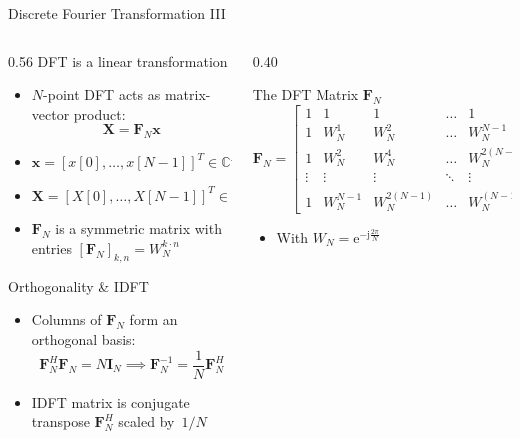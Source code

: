\begin{frame}{Discrete Fourier Transformation III}
\begin{columns}[T,onlytextwidth]
    \begin{column}{0.56\textwidth}
        DFT is a linear transformation
        \begin{itemize}
            \item $N$-point DFT acts as matrix-vector product:
                  \begin{equation*}
                      \mathbf{X} = \mathbf{F}_N \mathbf{x}
                  \end{equation*}
            \item $\mathbf{x} = [x[0], \dots, x[N-1]]^T \in \mathbb{C}^N$
            \item $\mathbf{X} = [X[0], \dots, X[N-1]]^T \in \mathbb{C}^N$
            \item $\mathbf{F}_N$ is a symmetric matrix with entries $[\mathbf{F}_N]_{k,n} = W_N^{k \cdot n}$
        \end{itemize}
        \vspace{0.4em}
        Orthogonality \& IDFT
        \begin{itemize}
            \item Columns of $\mathbf{F}_N$ form an orthogonal basis:
                  \begin{equation*}
                      \mathbf{F}_N^H \mathbf{F}_N = N \mathbf{I}_N \implies \mathbf{F}_N^{-1} = \frac{1}{N}\mathbf{F}_N^H
                  \end{equation*}
            \item IDFT matrix is conjugate transpose $\mathbf{F}_N^H$ scaled by~$1/N$
        \end{itemize}
        \vspace{0.4em}
    \end{column}

    \begin{column}{0.40\textwidth}
        \begin{block}{The DFT Matrix $\mathbf{F}_N$}
            \centering
            \footnotesize
            $\mathbf{F}_N = \begin{bmatrix}
                1 & 1 & 1 & \dots & 1 \\
                1 & W_N^1 & W_N^2 & \dots & W_N^{N-1} \\
                1 & W_N^2 & W_N^4 & \dots & W_N^{2(N-1)} \\
                \vdots & \vdots & \vdots & \ddots & \vdots \\
                1 & W_N^{N-1} & W_N^{2(N-1)} & \dots & W_N^{(N-1)^2}
            \end{bmatrix}$
            \begin{itemize}
                \item With $W_N = \mathrm{e}^{-\mathrm{j}\frac{2\pi}{N}}$
            \end{itemize}
        \end{block}
    \end{column}
\end{columns}
\end{frame}

